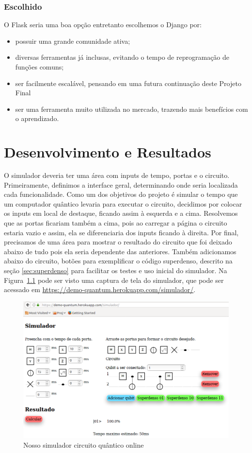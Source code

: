 \documentclass[a4paper, 12pt, oneside]{book}
\begin{document}
\subsection{Escolhido}
O Flask seria uma boa opção entretanto escolhemos o Django por:
\begin{itemize}
\item possuir uma grande comunidade ativa;
\item diversas ferramentas já inclusas, evitando o tempo de reprogramação de funções comuns;
\item ser facilmente escalável, pensando em uma futura continuação deste Projeto Final
\item ser uma ferramenta muito utilizada no mercado, trazendo mais benefícios com o aprendizado.
\end{itemize}


\chapter{Desenvolvimento e Resultados}
\thispagestyle{empty} 

O simulador deveria ter uma área com inputs de tempo, portas e o circuito. Primeiramente, definimos a interface geral, determinando onde seria localizada cada funcionalidade. Como um dos objetivos do projeto é simular o tempo que um computador quântico levaria para executar o circuito, decidimos por colocar os inputs em local de destaque, ficando assim à esquerda e a cima. Resolvemos que as portas ficariam também a cima, pois ao carregar a página o circuito estaria vazio e assim, ela se diferenciaria dos inputs ficando à direita. Por final, precisamos de uma área para mostrar o resultado do circuito que foi deixado abaixo de tudo pois ela seria dependente das anteriores. Também adicionamos abaixo do circuito, botões para exemplificar o código superdenso, descrito na seção \ref{sec:superdenso} para facilitar os testes e uso inicial do simulador. Na Figura~\ref{fig:simulador} pode ser visto uma captura de tela do simulador, que pode ser acessado em \url{https://demo-quantum.herokuapp.com/simulador/}.

\begin{figure}[H]
\centering
\includegraphics[scale=0.5]{simulador-pagina.png}
\caption{Nosso simulador circuito quântico online}
\label{fig:simulador}
\end{figure}
\end{document}
